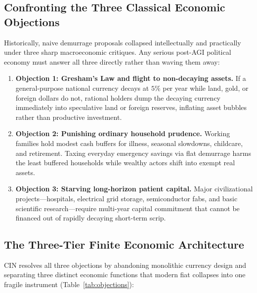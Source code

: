 \documentclass[11pt]{article}
\begin{document}
\subsection{Confronting the Three Classical Economic Objections}

Historically, naive demurrage proposals collapsed intellectually and practically under three sharp macroeconomic critiques. Any serious post-AGI political economy must answer all three directly rather than waving them away:

\begin{enumerate}
  \item \textbf{Objection 1: Gresham's Law and flight to non-decaying assets.} If a general-purpose national currency decays at $5\%$ per year while land, gold, or foreign dollars do not, rational holders dump the decaying currency immediately into speculative land or foreign reserves, inflating asset bubbles rather than productive investment.
  \item \textbf{Objection 2: Punishing ordinary household prudence.} Working families hold modest cash buffers for illness, seasonal slowdowns, childcare, and retirement. Taxing everyday emergency savings via flat demurrage harms the least buffered households while wealthy actors shift into exempt real assets.
  \item \textbf{Objection 3: Starving long-horizon patient capital.} Major civilizational projects---hospitals, electrical grid storage, semiconductor fabs, and basic scientific research---require multi-year capital commitment that cannot be financed out of rapidly decaying short-term scrip.
\end{enumerate}

\subsection{The Three-Tier Finite Economic Architecture}

CIN resolves all three objections by abandoning monolithic currency design and separating three distinct economic functions that modern fiat collapses into one fragile instrument (Table~\ref{tab:objections}):
\end{document}
